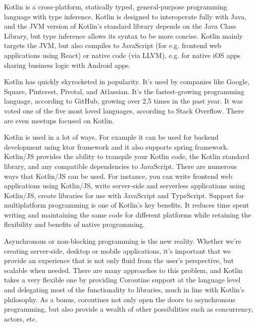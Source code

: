 \par Kotlin is a cross-platform, statically typed, general-purpose programming language with type inference. Kotlin is designed to interoperate fully with Java, and the JVM version of Kotlin's standard library depends on the Java Class Library, but type inference allows its syntax to be more concise. Kotlin mainly targets the JVM, but also compiles to JavaScript (for e.g. frontend web applications using React) or native code (via LLVM), e.g. for native iOS apps sharing business logic with Android apps. %

\par Kotlin has quickly skyrocketed in popularity. It's used by companies like Google, Square, Pinterest, Pivotal, and Atlassian. It's the fastest-growing programming language, according to GitHub, growing over 2,5 times in the past year. It was voted one of the five most loved languages, according to Stack Overflow. There are even meetups focused on Kotlin. 
\par Kotlin is used in a lot of ways. For example it can be used for backend development using ktor framework and it also supports spring framework. Kotlin/JS provides the ability to transpile your Kotlin code, the Kotlin standard library, and any compatible dependencies to JavaScript. There are numerous ways that Kotlin/JS can be used. For instance, you can write frontend web applications using Kotlin/JS,
write server-side and serverless applications using Kotlin/JS, create libraries for use with JavaScript and TypeScript. Support for multiplatform programming is one of Kotlin’s key benefits. It reduces time spent writing and maintaining the same code for different platforms while retaining the flexibility and benefits of native programming. 

\par Asynchronous or non-blocking programming is the new reality. Whether we're creating server-side, desktop or mobile applications, it's important that we provide an experience that is not only fluid from the user's perspective, but scalable when needed.
There are many approaches to this problem, and Kotlin takes a very flexible one by providing Coroutine support at the language level and delegating most of the functionality to libraries, much in line with Kotlin's philosophy.
As a bonus, coroutines not only open the doors to asynchronous programming, but also provide a wealth of other possibilities such as concurrency, actors, etc.


